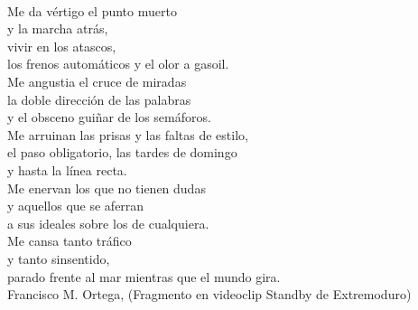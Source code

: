 \documentclass[b5paper,11pt,twoside,showtrims,openright]{memoir} %
\begin{document}
\newpage
\ 
\newpage
\thispagestyle{empty}
\vspace*{\fill}
\begin{center}
\begin{minipage}[c]{0.7\textwidth}
Me da vértigo el punto muerto\\
y la marcha atrás,\\
vivir en los atascos,\\
los frenos automáticos y el olor a gasoil.\\
Me angustia el cruce de miradas\\
la doble dirección de las palabras\\
y el obsceno guiñar de los semáforos.\\

Me arruinan las prisas y las faltas de estilo,\\
el paso obligatorio, las tardes de domingo\\
y hasta la línea recta.\\
Me enervan los que no tienen dudas\\
y aquellos que se aferran\\
a sus ideales sobre los de cualquiera.\\
Me cansa tanto tráfico\\
y tanto sinsentido,\\
parado frente al mar mientras que el mundo gira.\\


Francisco M. Ortega, (Fragmento en videoclip Standby de Extremoduro)\\
\end{minipage}
\end{center}
\vspace*{\fill}





\pagestyle{index}
\cleartorecto
\tableofcontents %
\cleartorecto
\listoftables    %
\cleartorecto
\listoffigures   %
\newpage

\setcounter{secnumdepth}{0}      %
\end{document}
